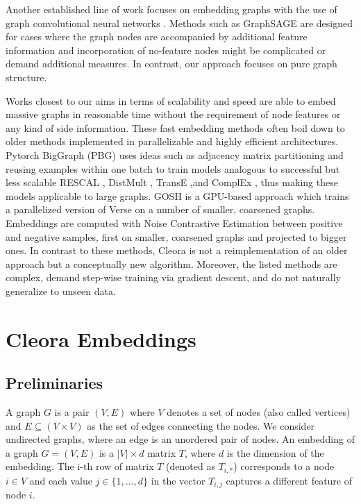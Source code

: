\documentclass{IEEEtran}
\begin{document}
Another established line of work focuses on embedding graphs with the use of graph  convolutional neural networks \cite{Kipf:2016tc}. Methods such as 
GraphSAGE \cite{NIPS2017_6703} are designed for cases where the graph nodes are accompanied by additional feature information and incorporation of no-feature nodes might be complicated or demand additional measures. In contrast, our approach focuses on pure graph structure. 

Works closest to our aims in terms of scalability and speed are able to embed massive graphs in reasonable time without the requirement of node features or any kind of side information. These fast embedding methods often boil down to older methods implemented in parallelizable and highly efficient architectures. Pytorch BigGraph (PBG) \cite{pbg} uses ideas such as adjacency matrix partitioning and reusing examples within one batch to train models analogous to successful but less scalable RESCAL \cite{10.5555/3104482.3104584}, DistMult \cite{yang2014embedding}, TransE \cite{bordes2013translating},and ComplEx \cite{trouillon2016complex}, thus making these models applicable to large graphs. GOSH \cite{10.1145/3404397.3404456} is a GPU-based approach which trains a parallelized version of Verse \cite{verse} on a number of smaller, coarsened graphs. Embeddings are computed with Noise Contrastive Estimation between positive and negative samples, first on smaller, coarsened graphs and projected to bigger ones. In contrast to these methods, Cleora is not a reimplementation of an older approach but a conceptually new algorithm. Moreover, the listed methods are complex, demand step-wise training via gradient descent, and do not naturally generalize to unseen data.

\section{Cleora Embeddings}

\subsection{Preliminaries} A graph $G$ is a pair $(V, E)$ where $V$ denotes a set of nodes (also called vertices) and $E \subseteq (V \times V)$ as the set of edges connecting the nodes. We consider undirected graphs, where an edge is an unordered pair of nodes. An embedding of a graph $G=(V,E)$ is a $|V| \times d$ matrix $T$, where $d$ is the dimension of the embedding. The i-th row of matrix $T$ (denoted as $T_{i,*}$) corresponds to a node $i \in V$  and each value $j \in \{1, ..., d\}$ in the vector $T_{i,j}$ captures a different feature of node $i$.
\end{document}
